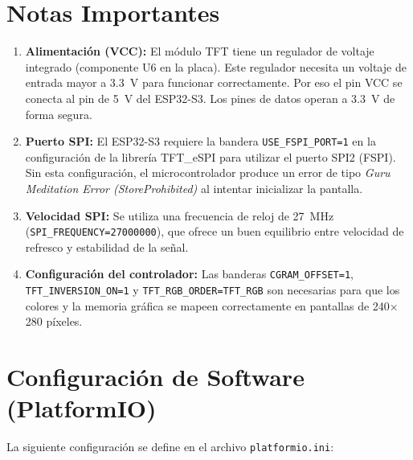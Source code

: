 \documentclass[11pt,a4paper]{article}
\begin{document}
\section{Notas Importantes}

\begin{enumerate}
    \item \textbf{Alimentación (VCC):} El módulo TFT tiene un regulador de voltaje integrado (componente U6 en la placa). Este regulador necesita un voltaje de entrada mayor a \SI{3.3}{\volt} para funcionar correctamente. Por eso el pin VCC se conecta al pin de \SI{5}{\volt} del ESP32-S3. Los pines de datos operan a \SI{3.3}{\volt} de forma segura.
    
    \item \textbf{Puerto SPI:} El ESP32-S3 requiere la bandera \texttt{USE\_FSPI\_PORT=1} en la configuración de la librería TFT\_eSPI para utilizar el puerto SPI2 (FSPI). Sin esta configuración, el microcontrolador produce un error de tipo \textit{Guru Meditation Error (StoreProhibited)} al intentar inicializar la pantalla.
    
    \item \textbf{Velocidad SPI:} Se utiliza una frecuencia de reloj de \SI{27}{\mega\hertz} (\texttt{SPI\_FREQUENCY=27000000}), que ofrece un buen equilibrio entre velocidad de refresco y estabilidad de la señal.
    
    \item \textbf{Configuración del controlador:} Las banderas \texttt{CGRAM\_OFFSET=1}, \texttt{TFT\_INVERSION\_ON=1} y \texttt{TFT\_RGB\_ORDER=TFT\_RGB} son necesarias para que los colores y la memoria gráfica se mapeen correctamente en pantallas de 240$\times$280 píxeles.
\end{enumerate}

\section{Configuración de Software (PlatformIO)}

La siguiente configuración se define en el archivo \texttt{platformio.ini}:
\end{document}
